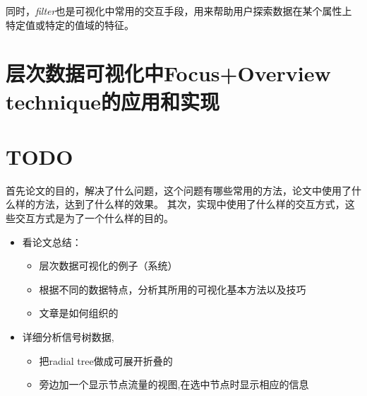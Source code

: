 \documentclass{article}
\begin{document}
同时，\emph{filter}也是可视化中常用的交互手段，用来帮助用户探索数据在某个属性上特定值或特定的值域的特征。


\section{层次数据可视化中Focus+Overview technique的应用和实现}

\section{TODO}

首先论文的目的，解决了什么问题，这个问题有哪些常用的方法，论文中使用了什么样的方法，达到了什么样的效果。
其次，实现中使用了什么样的交互方式，这些交互方式是为了一个什么样的目的。

\begin{itemize}
	\item 看论文总结：
		\begin{itemize}
			\item 层次数据可视化的例子（系统）
			\item 根据不同的数据特点，分析其所用的可视化基本方法以及技巧
			\item 文章是如何组织的
		\end{itemize}
	\item 详细分析信号树数据,
		\begin{itemize}
			\item 把radial tree做成可展开折叠的
			\item 旁边加一个显示节点流量的视图,在选中节点时显示相应的信息 
		\end{itemize}
\end{itemize}


\end{document}
